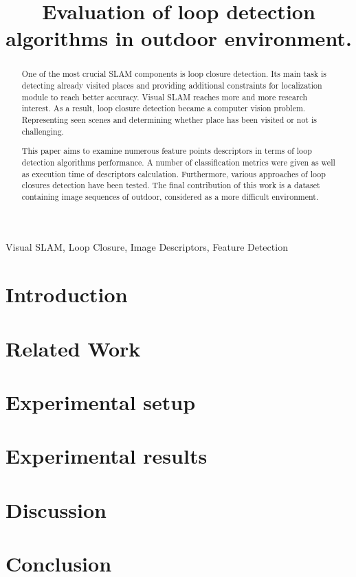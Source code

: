 \documentclass[conference]{IEEEtran}
\begin{document}
\title{Evaluation of loop detection algorithms in outdoor environment.}

\author{
\and
{}
}

\maketitle

\begin{abstract}
  One of the most crucial SLAM components is loop closure detection. Its main task is detecting
  already visited places and providing additional constraints for localization
  module to reach better accuracy. Visual SLAM reaches more and more research interest. As a
  result, loop closure detection became a computer vision
  problem. Representing seen scenes and determining whether place has been
  visited or not is challenging.

  This paper aims to examine numerous feature points descriptors in terms of loop
  detection algorithms performance. A number of classification metrics were given as well as
  execution time of descriptors calculation. Furthermore, various approaches of
  loop closures detection have been tested. The final contribution of this
  work is a dataset containing image sequences of outdoor, considered
  as a more difficult environment.

\end{abstract}

\begin{IEEEkeywords}
  Visual SLAM, Loop Closure, Image Descriptors, Feature Detection
\end{IEEEkeywords}

\section{Introduction}
\section{Related Work}
\section{Experimental setup}
\section{Experimental results}
\section{Discussion}
\section{Conclusion}
\end{document}
